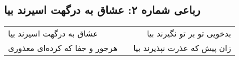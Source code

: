 \begin{center}
\section*{رباعی شماره ۲: عشاق به درگهت اسیرند بیا}
\label{sec:002}
\begin{longtable}{l p{0.5cm} r}
عشاق به درگهت اسیرند بیا
&&
بدخویی تو بر تو نگیرند بیا
\\
هرجور و جفا که کرده‌ای معذوری
&&
زان پیش که عذرت نپذیرند بیا
\\
\end{longtable}
\end{center}
